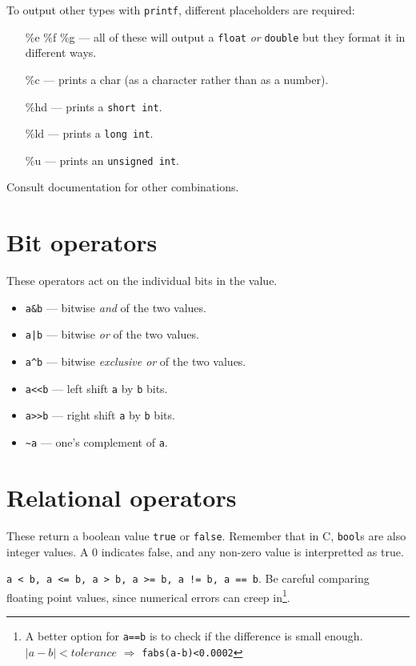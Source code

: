 To output other types with \texttt{printf}, different placeholders are required:
\begin{itemize}
 \item [\%e \%f \%g] --- all of these will output a \texttt{float} \emph{or} \texttt{double} but they format it in different ways.
 \item [\%c] --- prints a char (as a character rather than as a number).
 \item [\%hd] --- prints a \texttt{short int}.
 \item [\%ld] --- prints a \texttt{long int}.
 \item [\%u]  --- prints an \texttt{unsigned int}.
\end{itemize}
Consult documentation for other combinations.

\section{Bit operators}

These operators act on the individual bits in the value.

\begin{itemize}
 \item \lstinline|a&b| --- bitwise \emph{and} of the two values.
 \item \lstinline:a|b: --- bitwise \emph{or} of the two values.
 \item \lstinline|a^b| --- bitwise \emph{exclusive or} of the two values.
 \item \lstinline|a<<b| --- left shift \texttt{a} by \texttt{b} bits.
 \item \lstinline|a>>b| --- right shift \texttt{a} by \texttt{b} bits.
 \item \lstinline|~a| --- one's complement of \texttt{a}.
\end{itemize}

\section{Relational operators}

These return a boolean value \texttt{true} or \texttt{false}.
Remember that in C, \texttt{bool}s are also integer values.
A 0 indicates false, and any non-zero value is interpretted as true.

\lstinline|a < b, a <= b, a > b, a >= b, a != b, a == b|.
Be careful comparing floating point values, since numerical errors can 
creep in\footnote{A better option for \texttt{a==b} is to check if the difference is small 
enough. $|a-b|<tolerance$ $\Rightarrow$ \lstinline!fabs(a-b)<0.0002!}.

